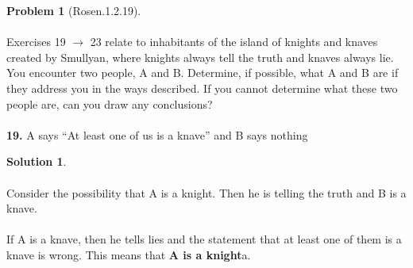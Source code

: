 \documentclass{article}
\theoremstyle{definition}
\newtheorem*{problem}{Problem}
\newtheorem*{solution}{Solution}
\begin{document}
\begin{problem}[Rosen.1.2.19]\ \\
\ \\
Exercises 19 $\rightarrow$ 23 relate to inhabitants of the island of knights
and knaves created by Smullyan, where knights always tell
the truth and knaves always lie. You encounter two people,
A and B. Determine, if possible, what A and B are if they
address you in the ways described. If you cannot determine
what these two people are, can you draw any conclusions?\ \\
\ \\
\textbf{19.} A says “At least one of us is a knave” and B says nothing\ \\
\begin{compactenum}
\renewcommand{\theenumi}{\alph{enumi}}

\end{compactenum}
\end{problem}

\begin{solution}\ \\
\ \\
Consider the possibility that A is a knight. Then he is telling the truth and B is a knave.\ \\
\ \\
If A is a knave, then he tells lies and the statement that at least one of them is a knave is wrong. This means that \textbf{A is a knight}a.\ \\
\begin{compactenum}
\renewcommand{\theenumi}{\alph{enumi}}


\end{compactenum}
\end{solution}
\end{document}
